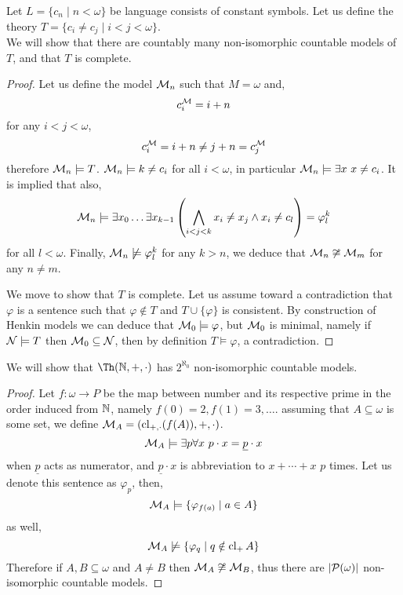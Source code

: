 \question{}
Let $L = \{ c_n \mid n < \omega \}$ be language consists of constant symbols.
Let us define the theory $T = \{ c_i \ne c_j \mid i < j < \omega \}$. \\
We will show that there are countably many non-isomorphic countable models of $T$, and that $T$ is complete.
\begin{proof}
	Let us define the model $\mathcal{M}_n$ such that $M = \omega$ and,
	\[
		c_i^{\mathcal{M}} = i + n
	\]
	for any $i < j < \omega$,
	\[
		c_i^{\mathcal{M}}
		= i + n
		\ne j + n
		= c_j^{\mathcal{M}}
	\]
	therefore $\mathcal{M}_n \models T$.
	$\mathcal{M}_n \models k \ne c_i$ for all $i < \omega$, in particular $\mathcal{M}_n \models \exists x\ x \ne c_i$.
	It is implied that also,
	\[
		\mathcal{M}_n
		\models \exists x_0 \ldots \exists x_{k - 1} \left( \bigwedge_{i < j < k} x_i \ne x_j \land x_i \ne c_l \right)
		= \varphi_l^k
	\]
	for all $l < \omega$.
	Finally, $\mathcal{M}_n \not\models \varphi_l^k$ for any $k > n$, we deduce that $\mathcal{M}_n \not\cong \mathcal{M}_m$ for any $n \ne m$.

	We move to show that $T$ is complete.
	Let us assume toward a contradiction that $\varphi$ is a sentence such that $\varphi \notin T$ and $T \cup \{ \varphi \}$ is consistent.
	By construction of Henkin models we can deduce that $\mathcal{M}_0 \models \varphi$, but $\mathcal{M}_0$ is minimal, namely if $\mathcal{N} \models T$ then $\mathcal{M}_0 \subseteq \mathcal{N}$,
	then by definition $T \models \varphi$, a contradiction.
\end{proof}

\question{}
We will show that $\Th(\NN, +, \cdot)$ has $2^{\aleph_0}$ non-isomorphic countable models.
\begin{proof}
	Let $f : \omega \to P$ be the map between number and its respective prime in the order induced from $\mathbb{N}$, namely $f(0) = 2, f(1) = 3, \ldots$.
	assuming that $A \subseteq \omega$ is some set, we define $\mathcal{M}_A = (\operatorname{cl}_{+, \cdot}(f(A)), +, \cdot)$.
	\[
		\mathcal{M}_A \models \exists p \forall x\ p \cdot x = \underline{p} \cdot x
	\]
	when $\underline{p}$ acts as numerator, and $\underline{p} \cdot x$ is abbreviation to $x + \cdots + x$ $p$ times.
	Let us denote this sentence as $\varphi_p$, then,
	\[
		\mathcal{M}_A \models \{ \varphi_{f(a)} \mid a \in A \}
	\]
	as well,
	\[
		\mathcal{M}_A \not\models \{ \varphi_q \mid q \notin \operatorname{cl}_+ A \}
	\]
	Therefore if $A, B \subseteq \omega$ and $A \ne B$ then $\mathcal{M}_A \not\cong \mathcal{M}_B$, thus there are $|\mathcal{P}(\omega)|$ non-isomorphic countable models.
\end{proof}

